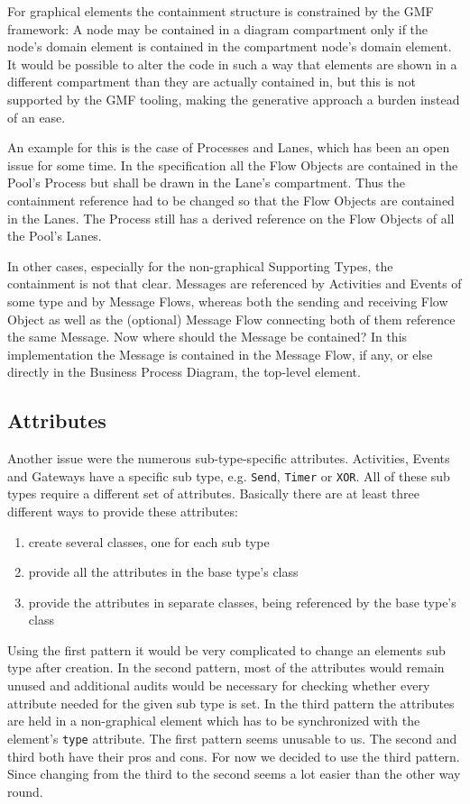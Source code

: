 For graphical elements the containment structure is constrained by the GMF framework: A node may be contained in a diagram compartment only if the node's domain element is contained in the compartment node's domain element. It would be possible to alter the code in such a way that elements are shown in a different compartment than they are actually contained in, but this is not supported by the GMF tooling, making the generative approach a burden instead of an ease.

An example for this is the case of Processes and Lanes, which has been an open issue for some time. In the specification all the Flow Objects are contained in the Pool's Process but shall be drawn in the Lane's compartment. Thus the containment reference had to be changed so that the Flow Objects are contained in the Lanes. The Process still has a derived reference on the Flow Objects of all the Pool's Lanes.

In other cases, especially for the non-graphical Supporting Types, the containment is not that clear. Messages are referenced by Activities and Events of some type and by Message Flows, whereas both the sending and receiving Flow Object as well as the (optional) Message Flow connecting both of them reference the same Message. Now where should the Message be contained? In this implementation the Message is contained in the Message Flow, if any, or else directly in the Business Process Diagram, the top-level element.


\subsection{Attributes}

Another issue were the numerous sub-type-specific attributes. Activities, Events and Gateways have a specific sub type, e.g. \verb|Send|, \verb|Timer| or \verb|XOR|. All of these sub types require a different set of attributes. Basically there are at least three different ways to provide these attributes:

\begin{enumerate}
	\item create several classes, one for each sub type
	\item provide all the attributes in the base type's class
	\item provide the attributes in separate classes, being referenced by the base type's class
\end{enumerate}

Using the first pattern it would be very complicated to change an elements sub type after creation. In the second pattern, most of the attributes would remain unused and additional audits would be necessary for checking whether every attribute needed for the given sub type is set. In the third pattern the attributes are held in a non-graphical element which has to be synchronized with the element's \verb|type| attribute. The first pattern seems unusable to us. The second and third both have their pros and cons. For now we decided to use the third pattern. Since changing from the third to the second seems a lot easier than the other way round.

